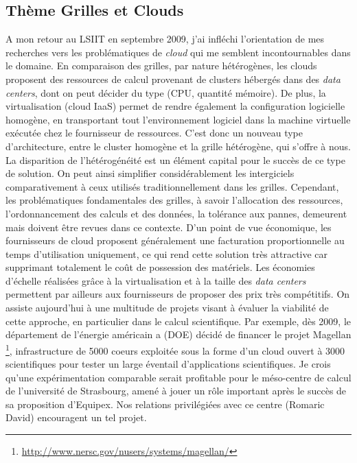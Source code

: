 \documentclass[11pt]{article}
\begin{document}
\subsection*{Thème Grilles et Clouds}

A mon retour au LSIIT en septembre 2009, j'ai infléchi l'orientation de 
mes recherches vers les problématiques de \emph{cloud} qui me semblent 
incontournables dans le domaine. En comparaison des grilles, par nature
hétérogènes, les clouds proposent des ressources de calcul provenant
de clusters hébergés dans des \textit{data centers}, dont on peut décider 
du type (CPU, quantité mémoire).  De plus, la virtualisation (cloud IaaS) 
permet de rendre également la configuration logicielle homogène, en transportant 
tout l'environnement logiciel dans la machine virtuelle exécutée chez le 
fournisseur de ressources. C'est donc un nouveau type d'architecture, 
entre le cluster homogène et la grille hétérogène, qui s'offre à nous. 
La disparition de l'hétérogénéité est un élément capital pour le succès
de ce type de solution. On peut ainsi simplifier considérablement les 
intergiciels comparativement à ceux utilisés traditionnellement dans les 
grilles. Cependant, les problématiques fondamentales des grilles, à
savoir l'allocation des ressources, l'ordonnancement des calculs et des
données, la tolérance aux pannes, demeurent mais doivent être revues 
dans ce contexte.
D'un point de vue économique, les fournisseurs de cloud proposent 
généralement une facturation proportionnelle au temps d'utilisation 
uniquement, ce qui rend cette solution très attractive car supprimant
totalement le coût de possession des matériels. Les économies d'échelle
réalisées grâce à la virtualisation et à la taille des \textit{data centers}
permettent par ailleurs aux fournisseurs de proposer des prix très 
compétitifs.  On assiste aujourd'hui à une multitude de projets visant 
à évaluer la viabilité de cette approche, en particulier dans le calcul 
scientifique. Par exemple, dès 2009, le département de l'énergie américain 
a (DOE) décidé de financer le projet Magellan%
\footnote{\url{http://www.nersc.gov/nusers/systems/magellan/}},
infrastructure de 5000 coeurs exploitée sous la forme d'un cloud
ouvert à 3000 scientifiques pour tester un large éventail 
d'applications scientifiques. Je crois qu'une expérimentation comparable
serait profitable pour le méso-centre de calcul de l'université de
Strasbourg, amené à jouer un rôle important après le succès de sa 
proposition d'Equipex. Nos relations privilégiées avec ce centre (Romaric 
David) encouragent un tel projet.\\
\end{document}
